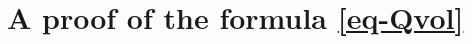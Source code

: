 \documentclass[12pt]{amsart}
\newtheorem{lem}[thm]{Lemma}
\theoremstyle{definition}
\def\lim{{\rm lim}}
\begin{document}




\section{A proof of the formula \eqref{eq-Qvol}}
\end{document}
